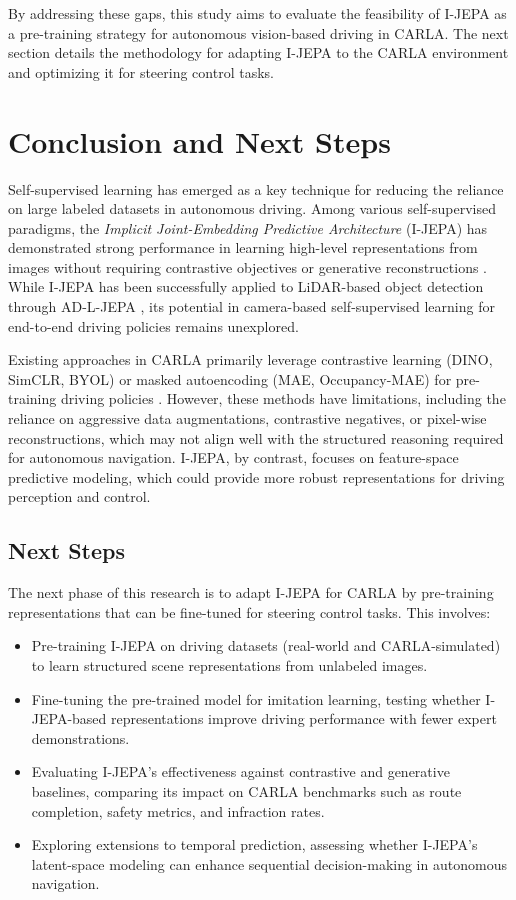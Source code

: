 \documentclass{article}
\begin{document}
By addressing these gaps, this study aims to evaluate the feasibility of I-JEPA as a pre-training strategy for autonomous vision-based driving in CARLA. The next section details the methodology for adapting I-JEPA to the CARLA environment and optimizing it for steering control tasks.

\section{Conclusion and Next Steps}

Self-supervised learning has emerged as a key technique for reducing the reliance on large labeled datasets in autonomous driving. Among various self-supervised paradigms, the \textit{Implicit Joint-Embedding Predictive Architecture} (I-JEPA) has demonstrated strong performance in learning high-level representations from images without requiring contrastive objectives or generative reconstructions \citep{jean2023ijepa}. While I-JEPA has been successfully applied to LiDAR-based object detection through AD-L-JEPA \citep{zhu2025adljepa}, its potential in camera-based self-supervised learning for end-to-end driving policies remains unexplored.

Existing approaches in CARLA primarily leverage contrastive learning (DINO, SimCLR, BYOL) or masked autoencoding (MAE, Occupancy-MAE) for pre-training driving policies \citep{carla_dino2024, carla_ssl2024}. However, these methods have limitations, including the reliance on aggressive data augmentations, contrastive negatives, or pixel-wise reconstructions, which may not align well with the structured reasoning required for autonomous navigation. I-JEPA, by contrast, focuses on feature-space predictive modeling, which could provide more robust representations for driving perception and control.

\subsection{Next Steps}
The next phase of this research is to adapt I-JEPA for CARLA by pre-training representations that can be fine-tuned for steering control tasks. This involves:

\begin{itemize}
    \item Pre-training I-JEPA on driving datasets (real-world and CARLA-simulated) to learn structured scene representations from unlabeled images.
    \item Fine-tuning the pre-trained model for imitation learning, testing whether I-JEPA-based representations improve driving performance with fewer expert demonstrations.
    \item Evaluating I-JEPA’s effectiveness against contrastive and generative baselines, comparing its impact on CARLA benchmarks such as route completion, safety metrics, and infraction rates.
    \item Exploring extensions to temporal prediction, assessing whether I-JEPA’s latent-space modeling can enhance sequential decision-making in autonomous navigation.
\end{itemize}
\end{document}

